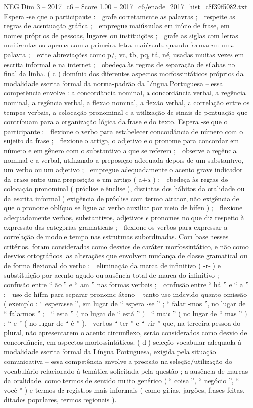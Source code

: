 \begin{textsample}{NEG Dim 3 – 2017\_c6 – Score 1.00 – 2017\_c6/enade\_2017\_hist\_c8f39f5082.txt}
Espera -se que o participante :  grafe corretamente as palavras ;  respeite as regras de acentuação gráfica ;  empregue maiúsculas em início de frase, em nomes próprios de pessoas, lugares ou instituições ;  grafe as siglas com letras maiúsculas ou apenas com a primeira letra maiúscula quando formarem uma palavra ;  evite abreviações como p/, vc, tb, pq, tá, né, usadas muitas vezes em escrita informal e na internet ;  obedeça às regras de separação de sílabas no final da linha. ( c ) domínio dos diferentes aspectos morfossintáticos próprios da modalidade escrita formal da norma-padrão da Língua Portuguesa – essa competência envolve : a concordância nominal, a concordância verbal, a regência nominal, a regência verbal, a flexão nominal, a flexão verbal, a correlação entre os tempos verbais, a colocação pronominal e a utilização de sinais de pontuação que contribuam para a organização lógica da frase e do texto.
Espera -se que o participante :  flexione o verbo para estabelecer concordância de número com o sujeito da frase ;  flexione o artigo, o adjetivo e o pronome para concordar em número e em gênero com o substantivo a que se referem ;  observe a regência nominal e a verbal, utilizando a preposição adequada depois de um substantivo, um verbo ou um adjetivo ;  empregue adequadamente o acento grave indicador da crase entre uma preposição e um artigo ( a+a ) ;  obedeça às regras de colocação pronominal ( próclise e ênclise ), distintas dos hábitos da oralidade ou da escrita informal ( exigência de próclise com termo atrator, não exigência de que o pronome oblíquo se ligue ao verbo auxiliar por meio de hífen ) ;  flexione adequadamente verbos, substantivos, adjetivos e pronomes no que diz respeito à expressão das categorias gramaticais ;  flexione os verbos para expressar a correlação de modo e tempo nas estruturas subordinadas.
Com base nesses critérios, foram considerados como desvios de caráter morfossintático, e não como desvios ortográficos, as alterações que envolvem mudança de classe gramatical ou de forma flexional do verbo :  eliminação da marca de infinitivo ( -r- ) e substituição por acento agudo ou ausência total de marca do infinitivo ;  confusão entre “ ão ” e “ am ” nas formas verbais ;  confusão entre “ há ” e “ a ” ;  uso de hífen para separar pronome átono – tanto uso indevido quanto omissão ( exemplo : “ esperasse ”, em lugar de “ espera -se ” ; “ falar -mos ”, no lugar de “ falarmos ” ;  “ esta ” ( no lugar de “ está ” ) ; “ mais ” ( no lugar de “ mas ” ) ; “ e ” ( no lugar de “ é ” ).  verbos “ ter ” e “ vir ” que, na terceira pessoa do plural, não apresentarem o acento circunflexo, serão considerados como desvio de concordância, em aspectos morfossintáticos. ( d ) seleção vocabular adequada à modalidade escrita formal da Língua Portuguesa, exigida pela situação comunicativa – essa competência envolve a precisão na seleção/utilização do vocabulário relacionado à temática solicitada pela questão ; a ausência de marcas da oralidade, como termos de sentido muito genérico ( “ coisa ”, “ negócio ”, “ você ” ) e termos de registros mais informais ( como gírias, jargões, frases feitas, ditados populares, termos regionais ).

\end{textsample}
